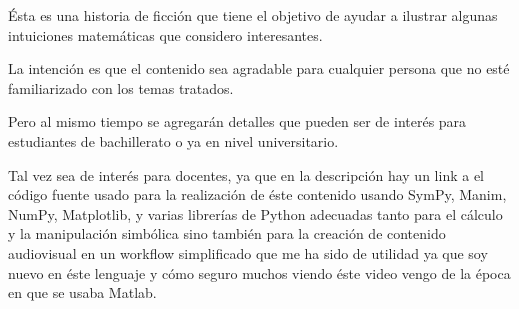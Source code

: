 \documentclass[preview]{standalone}
\begin{document}
\begin{center}
Ésta es una historia de ficción que tiene el objetivo de ayudar a ilustrar algunas intuiciones matemáticas que considero interesantes. 

La intención es que el contenido sea agradable para cualquier persona que no esté familiarizado con los temas tratados.  

Pero al mismo tiempo se agregarán detalles que pueden ser de interés para estudiantes de bachillerato o ya en nivel universitario. 

Tal vez sea de interés para docentes, ya que en la descripción hay un link a el código fuente usado para la realización de éste contenido usando SymPy, Manim, NumPy, Matplotlib, y varias librerías de Python adecuadas tanto para el cálculo y la manipulación simbólica sino también para la creación de contenido audiovisual en un workflow simplificado que me ha sido de utilidad ya que  soy nuevo en éste lenguaje y cómo seguro muchos viendo éste video vengo de la época en que se usaba Matlab.
\end{center}
\end{document}
